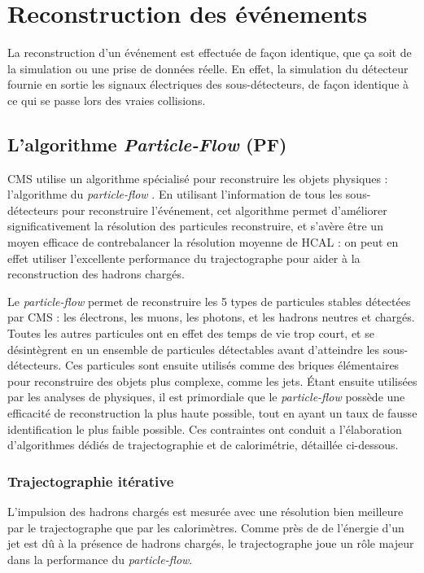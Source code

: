 \section{Reconstruction des événements}

La reconstruction d'un événement est effectuée de façon identique, que ça soit de la simulation ou une prise de données réelle. En effet, la simulation du détecteur fournie en sortie les signaux électriques des sous-détecteurs, de façon identique à ce qui se passe lors des vraies collisions.

\subsection{L'algorithme \emph{Particle-Flow} (PF)}

CMS utilise un algorithme spécialisé pour reconstruire les objets physiques : l'algorithme du \emph{particle-flow} \citep{pf,cms_pf_2,cms_pf_jets,cms_pf_leptons}. En utilisant l'information de tous les sous-détecteurs pour reconstruire l'événement, cet algorithme permet d'améliorer significativement la résolution des particules reconstruire, et s'avère être un moyen efficace de contrebalancer la résolution moyenne de HCAL : on peut en effet utiliser l'excellente performance du trajectographe pour aider à la reconstruction des hadrons chargés.


Le \emph{particle-flow} permet de reconstruire les 5 types de particules stables détectées par CMS : les électrons, les muons, les photons, et les hadrons neutres et chargés. Toutes les autres particules ont en effet des temps de vie trop court, et se désintègrent en un ensemble de particules détectables avant d'atteindre les sous-détecteurs. Ces particules sont ensuite utilisés comme des briques élémentaires pour reconstruire des objets plus complexe, comme les jets. Étant ensuite utilisées par les analyses de physiques, il est primordiale que le \emph{particle-flow} possède une efficacité de reconstruction la plus haute possible, tout en ayant un taux de fausse identification le plus faible possible. Ces contraintes ont conduit a l'élaboration d'algorithmes dédiés de trajectographie et de calorimétrie, détaillée ci-dessous.

\subsubsection{Trajectographie itérative} \label{sec:tracks_reconstruction}

L'impulsion des hadrons chargés est mesurée avec une résolution bien meilleure par le trajectographe que par les calorimètres. Comme près de  de l'énergie d'un jet est dû à la présence de hadrons chargés, le trajectographe joue un rôle majeur dans la performance du \emph{particle-flow}.

